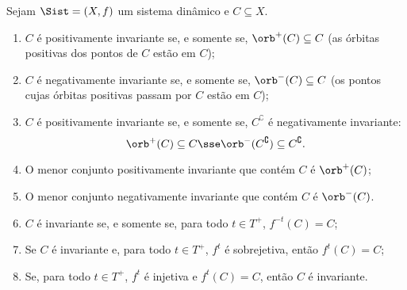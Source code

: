 \begin{proposition}
Sejam $\Sist=(X,f)$ um sistema dinâmico e $C \subseteq X$.
	\begin{enumerate}
	\item $C$ é positivamente invariante se, e somente se, $\orb^+(C) \subseteq C$ (as órbitas positivas dos pontos de $C$ estão em $C$);
	\item $C$ é negativamente invariante se, e somente se, $\orb^-(C) \subseteq C$ (os pontos cujas órbitas positivas passam por $C$ estão em $C$);
	\item $C$ é positivamente invariante se, e somente se, $C^\complement$ é negativamente invariante:
		\begin{equation*}
		\orb^+(C) \subseteq C \sse \orb^-(C^\complement) \subseteq C^\complement.
		\end{equation*}
	\item O menor conjunto positivamente invariante que contém $C$ é $\orb^+(C)$;
	\item O menor conjunto negativamente invariante que contém $C$ é $\orb^-(C)$.
	\item $C$ é invariante se, e somente se, para todo $t \in T^+$, $f^{-t}(C)=C$;
	\item Se $C$ é invariante e, para todo $t \in T^+$, $f^t$ é sobrejetiva, então $f^t(C)=C$;
	\item Se, para todo $t \in T^+$, $f^t$ é injetiva e $f^t(C)=C$, então $C$ é invariante.
	\end{enumerate}
\end{proposition}
